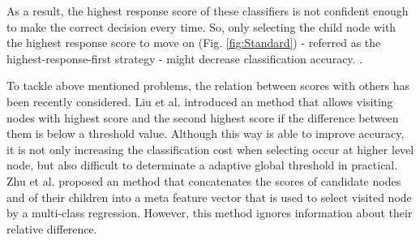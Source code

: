 \documentclass[review]{elsarticle}
\begin{document}
As a result, the highest response score of these classifiers is not confident enough to make the correct decision every time. 
So, only selecting the child node with the highest response score to move on (Fig. \ref{fig:Standard}) - referred as the highest-response-first strategy - might decrease classification accuracy. .

To tackle above mentioned problems, the relation between scores with others has been recently considered.
Liu et al. \cite{Liu.CVPR2013.ProbTree} introduced an method that allows visiting nodes with highest score and the second highest score if the difference between them is below a threshold value. 
Although this way is able to improve accuracy, it is not only increasing the classification cost when selecting occur at higher level node, but also difficult to determinate a adaptive global threshold in practical.  
Zhu et al. \cite{Zhu.CVIU2014} proposed an method that concatenates the scores of candidate nodes and of their children into a meta feature vector that is used to select visited node by a multi-class regression. 
However, this method ignores information about their relative difference.
\end{document}
